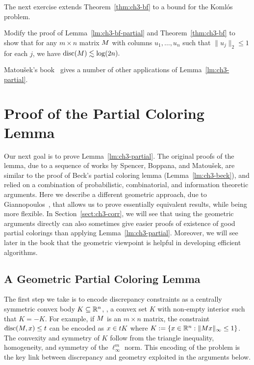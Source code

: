 The next exercise extends   Theorem~\ref{thm:ch3-bf} to a bound for
the Koml\'os problem.
\begin{exercise}\label{ex:ch3-komlos}
  Modify the proof of Lemma~\ref{lm:ch3-bf-partial} and
  Theorem~\ref{thm:ch3-bf} to show that for any $m\times n$ matrix
  \(M\) with columns $u_1, \ldots, u_n$ such that
  $\|u_j\|_2 \le 1$ for each $j$, we have
  \(\operatorname{disc}(M)\lesssim \log(2n).\)
\end{exercise}

Matou\v{s}ek's book~\cite{matousek2010geometric} gives a number of other applications of
Lemma~\ref{lm:ch3-partial}. 

\section{Proof of the Partial Coloring Lemma}
\label{sec:ch3-giann}

Our next goal is to prove Lemma~\ref{lm:ch3-partial}. The original
proofs of the lemma, due to a sequence of works by Spencer, Boppana, and Matou\v{s}ek, are
similar to the proof of Beck's partial coloring lemma
(Lemma~\ref{lm:ch3-beck}), and relied on a combination of probabilistic, combinatorial,
and information theoretic arguments. Here we describe a different
geometric approach, due to Giannopoulos~\cite{Gia93}, that
allows us to prove essentially equivalent results, while being more
flexible. In Section~\ref{sect:ch3-corr}, we will see that using the geometric
arguments directly can also sometimes give easier proofs of existence of
good partial colorings than applying  Lemma~\ref{lm:ch3-partial}. 
Moreover, we will see later in the book that the geometric viewpoint is 
helpful in developing efficient algorithms.

\subsection{A Geometric Partial Coloring Lemma}

The first step we take is to encode discrepancy constraints as a
centrally symmetric convex body \(K \subseteq \mathbb{R}^n\), \ie, a convex
set \(K\) with non-empty interior such that \(K = -K\). For example,
if \(M\) is an \(m \times n\) matrix, the constraint
\(\operatorname{disc}(M,x) \le t\) can be encoded as \(x \in tK\) where
\(K := \{x \in \mathbb{R}^n: \|Mx\|_\infty \le 1\}\). The
convexity and symmetry of \(K\) follow from the triangle inequality,
homogeneity, and symmetry of the \(\ell_\infty^m\) norm. This encoding
of the problem is the key link between discrepancy and geometry
exploited in the arguments below.

